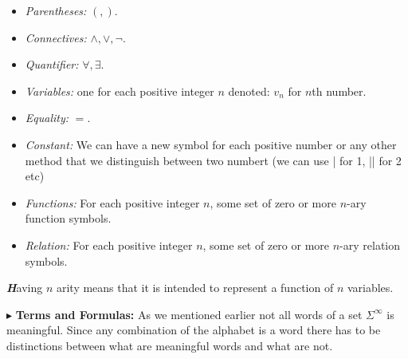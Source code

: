 \documentclass[9pt,a4paper,twocolumn]{article}
\newenvironment{callout}
	{\begin{calloutbox}\color{charcoal}\textbf\textit}
	{\end{calloutbox}}
\newcommand{\newpoint}[1]{\indent$\blacktriangleright$ \textbf{#1}}
\begin{document}
                    \begin{itemize}
                        \item \textit{Parentheses:} $(,)$.
                        \item \textit{Connectives:} $\land, \lor, \neg$.
                        \item \textit{Quantifier:} $\forall, \exists$.
                        \item \textit{Variables:} one for each positive integer $n$ denoted: $v_n$ for $n$th number.
                        \item \textit{Equality:} $=$.
                        \item \textit{Constant:} We can have a new symbol for each positive number or any other method that we distinguish between two numbert (we can use | for 1, || for 2 etc)
                        \item \textit{Functions:} For each positive integer $n$, some set of zero or more $n$-ary function symbols.
                        \item \textit{Relation:} For each positive integer $n$, some set of zero or more $n$-ary relation symbols.
                    \end{itemize}
                    \begin{callout}
                        Having $n$ arity means that it is intended to represent a function of $n$ variables.
                    \end{callout}
                    \newpoint{Terms and Formulas:} As we mentioned earlier not all words of a set $\Sigma^\infty$ is meaningful. Since any combination of the alphabet is a word there has to be distinctions between what are meaningful words and what are not.
\end{document}
